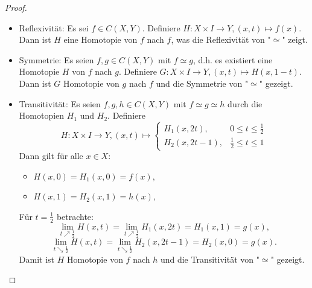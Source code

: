 \documentclass[a4paper,11pt,notitlepage]{report}
\theoremstyle{definition}
\begin{document}
\begin{proof}
	\begin{itemize}
		\item Reflexivität: Es sei $f \in C(X,Y)$.
			Definiere $H \colon X \times I \rightarrow Y, (x,t) \mapsto f(x)$.
			Dann ist $H$ eine Homotopie von $f$ nach $f$, was die Reflexivität von "$\simeq$" zeigt.
		\item Symmetrie: Es seien $f,g \in C(X,Y)$ mit $f \simeq g$, d.h. es existiert eine Homotopie $H$ von $f$ nach $g$. Definiere $G \colon X \times I \rightarrow Y, (x,t) \mapsto H(x,1-t)$.
		Dann ist $G$ Homotopie von $g$ nach $f$ und die Symmetrie von "$\simeq$" gezeigt.
		\item Transitivität: Es seien $f,g,h \in C(X,Y)$ mit $f \simeq g \simeq h$ durch die Homotopien $H_1$ und $H_2$. Definiere 
			$$H \colon X \times I \rightarrow Y, (x,t) \mapsto \begin{cases} H_1(x,2t),& 0 \leq t \leq \frac{1}{2} \\ H_2(x,2t-1), & \frac{1}{2} \leq t \leq 1 \end{cases}$$
			Dann gilt für alle $x \in X$:
			\begin{itemize}
				\item $H(x,0) = H_1(x,0)=f(x),$
				\item $H(x,1) = H_2(x,1)=h(x),$
			\end{itemize}
			Für $t = \frac{1}{2}$ betrachte:
			$$\lim\limits_{t \nearrow \frac{1}{2}}{H(x,t)} = \lim\limits_{t \nearrow \frac{1}{2}}{H_1(x,2t)} = H_1(x,1) = g(x),$$
			$$\lim\limits_{t \searrow \frac{1}{2}}{H(x,t)} = \lim\limits_{t \searrow \frac{1}{2}}{H_2(x,2t-1)}=H_2(x,0)=g(x).$$
			Damit ist $H$ Homotopie von $f$ nach $h$ und die Transitivität von "$\simeq$" gezeigt.
	\end{itemize}
\end{proof}
\end{document}
